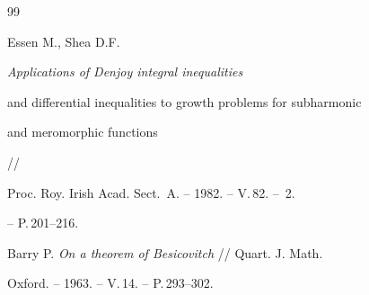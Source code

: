 \begin{thebibliography}{99}


Essen M., Shea D.F. {\em Applications of Denjoy integral inequalities 


and differential inequalities to growth problems for subharmonic 


and meromorphic functions} // 


Proc. Roy. Irish Acad. Sect.~A. -- 1982. -- V.\,82. -- \No\,2. 


-- P.\,201--216. 




Barry P. {\em On a theorem of Besicovitch} // Quart. J. Math. 


Oxford. -- 1963. -- V.\,14. -- P.\,293--302. 


 


\end{thebibliography} 


 


\vskip 2cm 


 






\smallskip







\label{end} 


 


 



